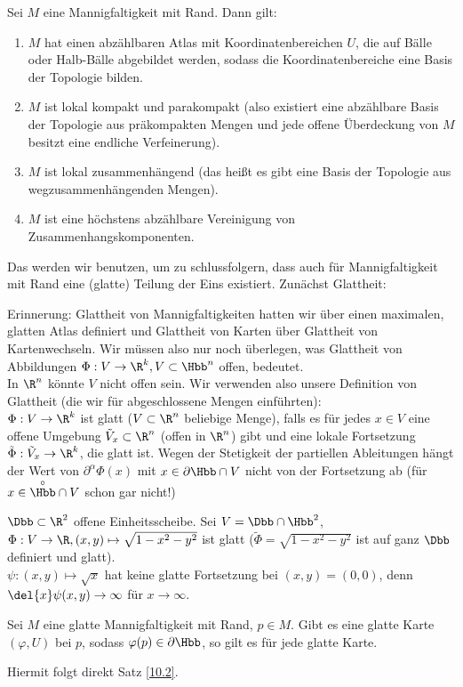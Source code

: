 \begin{thm}\autolabel
	Sei $M$ eine Mannigfaltigkeit mit Rand. Dann gilt:
	\begin{enumerate}[label={\roman*})]
		\item $M$ hat einen abzählbaren Atlas mit Koordinatenbereichen $U$, die auf Bälle oder Halb-Bälle abgebildet werden, sodass die Koordinatenbereiche eine Basis der Topologie bilden.
		\item $M$ ist lokal kompakt und parakompakt (also existiert eine abzählbare Basis der Topologie aus präkompakten Mengen und jede offene Überdeckung von $M$ besitzt eine endliche Verfeinerung).
		\item $M$ ist lokal zusammenhängend (das heißt es gibt eine Basis der Topologie aus wegzusammenhängenden Mengen).
		\item $M$ ist eine höchstens abzählbare Vereinigung von Zusammenhangskomponenten.
	\end{enumerate}
\end{thm}

Das werden wir benutzen, um zu schlussfolgern, dass auch für Mannigfaltigkeit mit Rand eine (glatte) Teilung der Eins existiert. Zunächst Glattheit:

\begin{rem}\autolabel
	Erinnerung: Glattheit von Mannigfaltigkeiten hatten wir über einen maximalen, glatten Atlas definiert und Glattheit von Karten über Glattheit von Kartenwechseln. Wir müssen also nur noch überlegen, was Glattheit von Abbildungen \( \Phi: V \to \R^k, V \subset \Hbb^n \) offen, bedeutet.\\
	In $\R^n$ könnte $V$ nicht offen sein. Wir verwenden also unsere Definition von Glattheit (die wir für abgeschlossene Mengen einführten):\\
	\( \Phi: V \to \R^k \) ist glatt ($V \subset \R^n$ beliebige Menge), falls es für jedes $x \in V$ eine offene Umgebung $\tilde{V}_x \subset \R^n$ (offen in $\R^n$) gibt und eine lokale Fortsetzung $\tilde{\Phi}: \tilde{V}_x \to \R^k$, die glatt ist.
	Wegen der Stetigkeit der partiellen Ableitungen hängt der Wert von \( \partial^\alpha \Phi(x) \) mit $x \in \partial\Hbb \cap V$ nicht von der Fortsetzung ab (für $x \in \overset{\circ}{\Hbb} \cap V$ schon gar nicht!)
\end{rem}

\begin{exmp*}
	\( \Dbb \subset\R^2 \) offene Einheitsscheibe. Sei \( V = \Dbb \cap \Hbb^2\), \(\Phi: V \to \R, (x,y) \mapsto \sqrt{1-x^2-y^2} \) ist glatt ($\tilde{\Phi} = \sqrt{1-x^2-y^2}$ ist auf ganz $\Dbb$ definiert und glatt).\\
	\( \psi: (x,y) \mapsto \sqrt{x} \) hat keine glatte Fortsetzung bei $(x,y) = (0,0)$, denn \( \del{x}\psi(x,y) \to \infty \) für $x \to \infty$.
\end{exmp*}

\begin{thm}\autolabel
	Sei $M$ eine glatte Mannigfaltigkeit mit Rand, $p \in M$. Gibt es eine glatte Karte $(\varphi,U)$ bei $p$, sodass $\varphi(p) \in \partial\Hbb$, so gilt es für jede glatte Karte.
\end{thm}

\noindent Hiermit folgt direkt Satz \ref{10.2}.